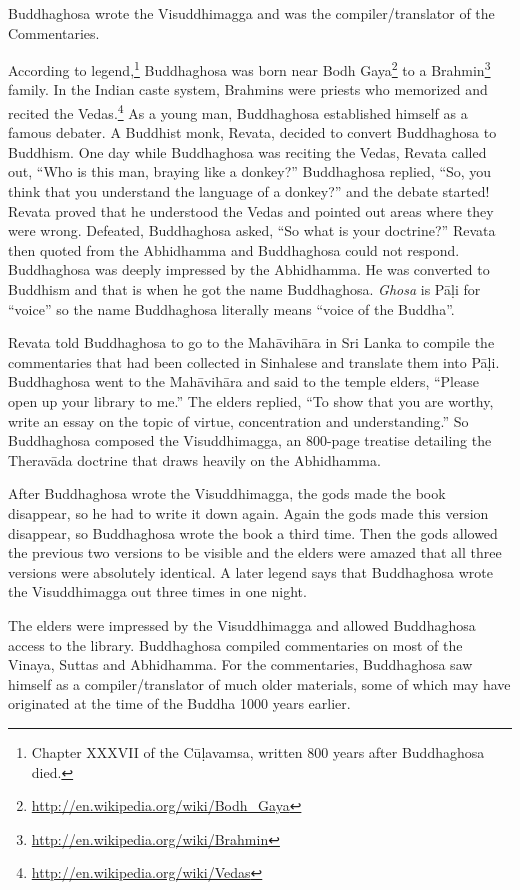 
Buddhaghosa wrote the Visuddhimagga and was the compiler/translator of the Commentaries.

According to legend,\footnote{Chapter XXXVII of the Cūḷavamsa, written 800 years after Buddhaghosa died.} Buddhaghosa was born near Bodh Gaya\footnote{\url{http://en.wikipedia.org/wiki/Bodh_Gaya}} to a Brahmin\footnote{\url{http://en.wikipedia.org/wiki/Brahmin}} family. In the Indian caste system, Brahmins were priests who memorized and recited the Vedas.\footnote{\url{http://en.wikipedia.org/wiki/Vedas}} As a young man, Buddhaghosa established himself as a famous debater. A Buddhist monk, Revata, decided to convert Buddhaghosa to Buddhism. One day while Buddhaghosa was reciting the Vedas, Revata called out, “Who is this man, braying like a donkey?” Buddhaghosa replied, “So, you think that you understand the language of a donkey?” and the debate started! Revata proved that he understood the Vedas and pointed out areas where they were wrong. Defeated, Buddhaghosa asked, “So what is your doctrine?” Revata then quoted from the Abhidhamma and Buddhaghosa could not respond. Buddhaghosa was deeply impressed by the Abhidhamma. He was converted to Buddhism and that is when he got the name Buddhaghosa. \textit{Ghosa} is Pāḷi for “voice” so the name Buddhaghosa literally means “voice of the Buddha”.

Revata told Buddhaghosa to go to the Mahāvihāra in Sri Lanka to compile the commentaries that had been collected in Sinhalese and translate them into Pāḷi. Buddhaghosa went to the Mahāvihāra and said to the temple elders, “Please open up your library to me.” The elders replied, “To show that you are worthy, write an essay on the topic of virtue, concentration and understanding.” So Buddhaghosa composed the Visuddhimagga, an 800-page treatise detailing the Theravāda doctrine that draws heavily on the Abhidhamma.

After Buddhaghosa wrote the Visuddhimagga, the gods made the book disappear, so he had to write it down again. Again the gods made this version disappear, so Buddhaghosa wrote the book a third time. Then the gods allowed the previous two versions to be visible and the elders were amazed that all three versions were absolutely identical. A later legend says that Buddhaghosa wrote the Visuddhimagga out three times in one night. 

The elders were impressed by the Visuddhimagga and allowed Buddhaghosa access to the library. Buddhaghosa compiled commentaries on most of the Vinaya, Suttas and Abhidhamma. For the commentaries, Buddhaghosa saw himself as a compiler/translator of much older materials, some of which may have originated at the time of the Buddha 1000 years earlier.

